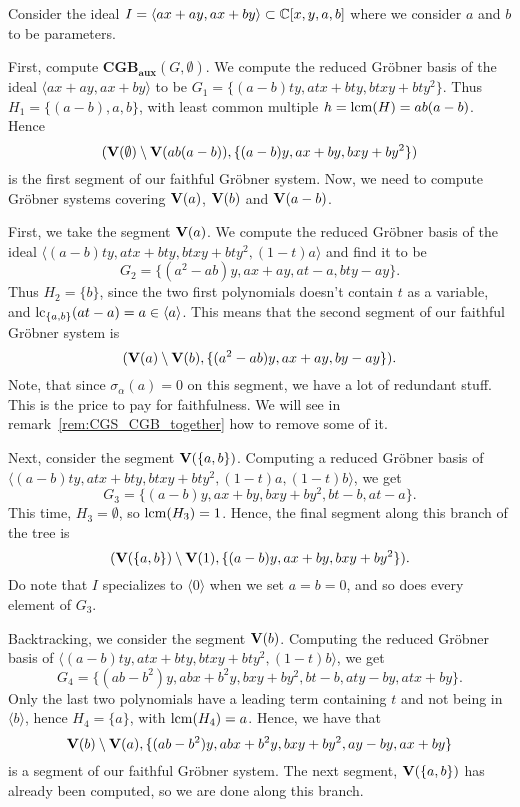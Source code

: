 \begin{example}\upshape
  Consider the ideal $I = \langle ax + ay, ax + by \rangle \subset \mathbb{C}[x, y, a, b]$ where we consider $a$ and $b$ to be parameters.

  First, compute $\mathbf{CGB_{aux}}(G, \emptyset)$. We compute the reduced Gröbner basis of the ideal $\langle ax + ay, ax + by \rangle$ to be
  $G_{1} = \{(a - b)ty, atx + bty, btxy + bty^{2} \}$. Thus $H_{1} = \{(a - b), a, b\}$, with least common multiple $h = \operatorname{lcm}(H) = ab(a - b)$. Hence
  \[(\operatorname{\mathbf V}(\emptyset) \setminus \operatorname{\mathbf V}(ab(a - b)), \{(a - b)y, ax + by, bxy + by^{2}\})\]
  is the first segment of our faithful Gröbner system. Now, we need to compute Gröbner systems covering $\operatorname{\mathbf V}(a)$, $\operatorname{\mathbf V}(b)$ and $\operatorname{\mathbf V}(a - b)$.

  First, we take the segment $\operatorname{\mathbf V}(a)$. We compute the reduced Gröbner basis of the ideal $\langle (a - b)ty, atx + bty, btxy + bty^{2}, (1 - t)a \rangle$ and find it to be
  \[G_{2} = \{ (a^2 - ab)y, ax + ay, at - a, bty - ay\}.\]
  Thus $H_{2} = \{b\}$, since the two first polynomials doesn't contain $t$ as a variable, and $\operatorname{lc}_{\{a, b\}}(at - a) = a \in \langle a \rangle$. This means that the second segment of our faithful Gröbner system is
  \[(\operatorname{\mathbf V}(a) \setminus \operatorname{\mathbf V}(b),\{(a^2 - ab)y, ax + ay, by - ay\} ).\]
  Note, that since $\sigma_{\alpha}(a) = 0$ on this segment, we have a lot of redundant stuff. This is the price to pay for faithfulness. We will see in remark~\ref{rem:CGS_CGB_together} how to remove some of it.

  Next, consider the segment $\operatorname{\mathbf V}(\{a, b\})$. Computing a reduced Gröbner basis of $\langle (a - b)ty, atx + bty, btxy + bty^{2}, (1 - t)a, (1 - t)b \rangle$, we get
  \[G_{3} = \{ (a - b)y, ax + by, bxy + by^2, bt - b, at - a\}.\]
  This time, $H_{3} = \emptyset$, so $\operatorname{lcm}(H_{3}) = 1$. Hence, the final segment along this branch of the tree is
  \[(\operatorname{\mathbf V}(\{a, b\}) \setminus \operatorname{\mathbf V}(1), \{(a - b)y, ax + by, bxy + by^2\}).\]
  Do note that $I$ specializes to $\langle 0 \rangle$ when we set $a = b = 0$, and so does every element of $G_{3}$.

  Backtracking, we consider the segment $\operatorname{\mathbf V}(b)$. Computing the reduced Gröbner basis of $\langle (a - b)ty, atx + bty, btxy + bty^{2}, (1 - t)b \rangle$, we get
  \[G_{4} = \{(ab - b^{2})y, abx + b^{2}y, bxy + by^{2}, bt - b, aty - by, atx + by\}.\]
  Only the last two polynomials have a leading term containing $t$ and not being in $\langle b \rangle$, hence $H_{4} = \{a\}$, with $\operatorname{lcm}(H_{4}) = a$. Hence, we have that
  \[\operatorname{\mathbf V}(b) \setminus \operatorname{\mathbf V}(a), \{(ab - b^{2})y, abx + b^{2}y, bxy + by^{2}, ay - by, ax + by\}\]
  is a segment of our faithful Gröbner system. The next segment, $\operatorname{\mathbf V}(\{a, b\})$ has already been computed, so we are done along this branch.


\end{example}
